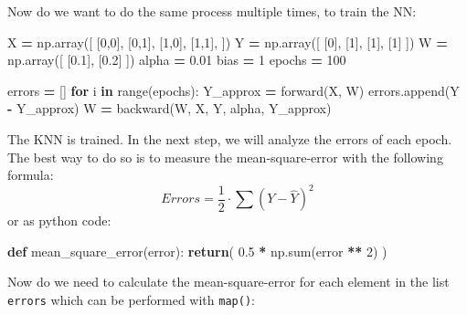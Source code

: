 \documentclass[
]{book}
\newenvironment{Shaded}{\begin{snugshade}}{\end{snugshade}}
\newcommand{\BuiltInTok}[1]{#1}
\newcommand{\ControlFlowTok}[1]{\textcolor[rgb]{0.13,0.29,0.53}{\textbf{#1}}}
\newcommand{\DecValTok}[1]{\textcolor[rgb]{0.00,0.00,0.81}{#1}}
\newcommand{\FloatTok}[1]{\textcolor[rgb]{0.00,0.00,0.81}{#1}}
\newcommand{\KeywordTok}[1]{\textcolor[rgb]{0.13,0.29,0.53}{\textbf{#1}}}
\newcommand{\NormalTok}[1]{#1}
\newcommand{\OperatorTok}[1]{\textcolor[rgb]{0.81,0.36,0.00}{\textbf{#1}}}
\begin{document}
Now do we want to do the same process multiple times, to train the NN:

\begin{Shaded}
\begin{Highlighting}[]
\NormalTok{X }\OperatorTok{=}\NormalTok{ np.array([}
\NormalTok{  [}\DecValTok{0}\NormalTok{,}\DecValTok{0}\NormalTok{],}
\NormalTok{  [}\DecValTok{0}\NormalTok{,}\DecValTok{1}\NormalTok{],}
\NormalTok{  [}\DecValTok{1}\NormalTok{,}\DecValTok{0}\NormalTok{],}
\NormalTok{  [}\DecValTok{1}\NormalTok{,}\DecValTok{1}\NormalTok{],}
\NormalTok{])}
\NormalTok{Y }\OperatorTok{=}\NormalTok{ np.array([}
\NormalTok{  [}\DecValTok{0}\NormalTok{],}
\NormalTok{  [}\DecValTok{1}\NormalTok{],}
\NormalTok{  [}\DecValTok{1}\NormalTok{],}
\NormalTok{  [}\DecValTok{1}\NormalTok{]}
\NormalTok{])}
\NormalTok{W }\OperatorTok{=}\NormalTok{ np.array([}
\NormalTok{  [}\FloatTok{0.1}\NormalTok{], }
\NormalTok{  [}\FloatTok{0.2}\NormalTok{]}
\NormalTok{])}
\NormalTok{alpha }\OperatorTok{=} \FloatTok{0.01}
\NormalTok{bias }\OperatorTok{=} \DecValTok{1}
\NormalTok{epochs }\OperatorTok{=} \DecValTok{100}

\NormalTok{errors }\OperatorTok{=}\NormalTok{ []}
\ControlFlowTok{for}\NormalTok{ i }\KeywordTok{in} \BuiltInTok{range}\NormalTok{(epochs):}
\NormalTok{  Y\_approx }\OperatorTok{=}\NormalTok{ forward(X, W)}
\NormalTok{  errors.append(Y }\OperatorTok{{-}}\NormalTok{ Y\_approx)}
\NormalTok{  W }\OperatorTok{=}\NormalTok{ backward(W, X, Y, alpha, Y\_approx)}
\end{Highlighting}
\end{Shaded}

The KNN is trained. In the next step, we will analyze the errors of each epoch. The best way to do so is to measure the mean-square-error with the following formula:
\[
  Errors = \frac{1}{2} \cdot \sum(Y-\hat{Y})^2
\]
or as python code:

\begin{Shaded}
\begin{Highlighting}[]
\KeywordTok{def}\NormalTok{ mean\_square\_error(error):}
  \ControlFlowTok{return}\NormalTok{( }\FloatTok{0.5} \OperatorTok{*}\NormalTok{ np.}\BuiltInTok{sum}\NormalTok{(error }\OperatorTok{**} \DecValTok{2}\NormalTok{) )}
\end{Highlighting}
\end{Shaded}

Now do we need to calculate the mean-square-error for each element in the list \texttt{errors} which can be performed with \texttt{map()}:
\end{document}
